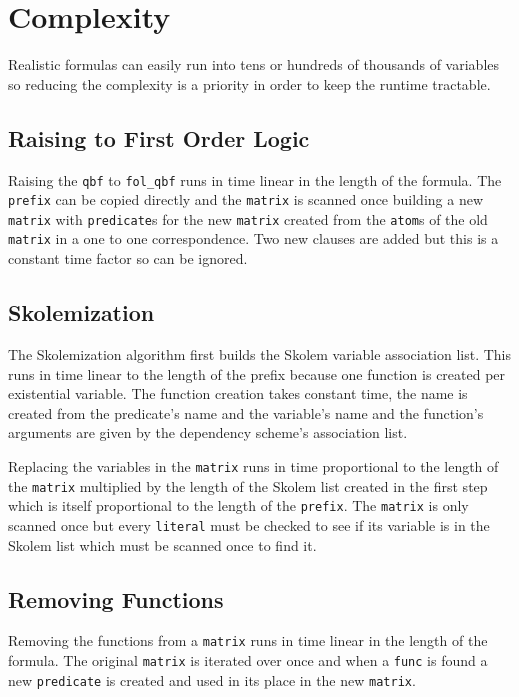 \section{Complexity}
Realistic formulas can easily run into tens or hundreds of thousands of variables so reducing the complexity is a priority in order to keep the runtime tractable.

\subsection{Raising to First Order Logic}
Raising the \texttt{qbf} to \texttt{fol\_qbf} runs in time linear in the length of the formula. The \texttt{prefix} can be copied directly and the \texttt{matrix} is scanned once building a new \texttt{matrix} with \texttt{predicate}s for the new \texttt{matrix} created from the \texttt{atom}s of the old \texttt{matrix} in a one to one correspondence. Two new clauses are added but this is a constant time factor so can be ignored.

\subsection{Skolemization}
The Skolemization algorithm first builds the Skolem variable association list. This runs in time linear to the length of the prefix because one function is created per existential variable. The function creation takes constant time, the name is created from the predicate's name and the variable's name and the function's arguments are given by the dependency scheme's association list.

Replacing the variables in the \texttt{matrix} runs in time proportional to the length of the \texttt{matrix} multiplied by the length of the Skolem list created in the first step which is itself proportional to the length of the \texttt{prefix}. The \texttt{matrix} is only scanned once but every \texttt{literal} must be checked to see if its variable is in the Skolem list which must be scanned once to find it.

\subsection{Removing Functions}
Removing the functions from a \texttt{matrix} runs in time linear in the length of the formula. The original \texttt{matrix} is iterated over once and when a \texttt{func} is found a new \texttt{predicate} is created and used in its place in the new \texttt{matrix}.

